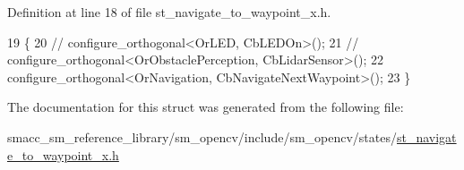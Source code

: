 Definition at line 18 of file st\+\_\+navigate\+\_\+to\+\_\+waypoint\+\_\+x.\+h.


\begin{DoxyCode}
19         \{
20             \textcolor{comment}{// configure\_orthogonal<OrLED, CbLEDOn>();}
21             \textcolor{comment}{// configure\_orthogonal<OrObstaclePerception, CbLidarSensor>();}
22             configure\_orthogonal<OrNavigation, CbNavigateNextWaypoint>();
23         \}
\end{DoxyCode}


The documentation for this struct was generated from the following file\+:\begin{DoxyCompactItemize}
\item 
smacc\+\_\+sm\+\_\+reference\+\_\+library/sm\+\_\+opencv/include/sm\+\_\+opencv/states/\hyperlink{st__navigate__to__waypoint__x_8h}{st\+\_\+navigate\+\_\+to\+\_\+waypoint\+\_\+x.\+h}\end{DoxyCompactItemize}
